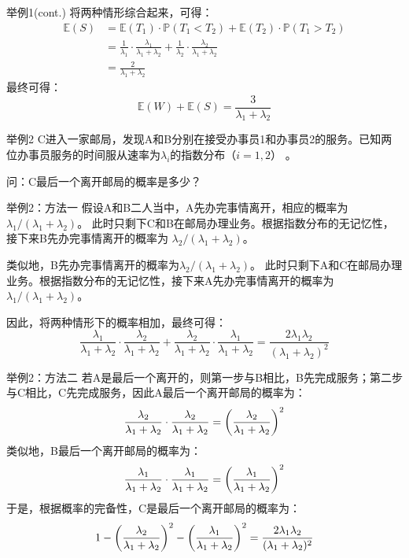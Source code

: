\documentclass[t]{beamer}
\renewcommand{\Pr}{\mathbb{P}}
\newcommand{\E}{\mathbb{E}}
\begin{document}
\begin{frame}{举例1(cont.)}
    将两种情形综合起来，可得：
\[\begin{split}
\E(S)&=\E(T_1)\cdot \Pr(T_1<T_2)+\E(T_2)\cdot \Pr(T_1>T_2)\\
&=\frac{1}{\lambda_1}\cdot \frac{\lambda_1}{\lambda_1+\lambda_2}+\frac{1}{\lambda_2}\cdot \frac{\lambda_2}{\lambda_1+\lambda_2}\\
&=\frac{2}{\lambda_1+\lambda_2}
\end{split}
\]
最终可得：
\[\E(W)+\E(S)=\frac{3}{\lambda_1+\lambda_2} \]
\end{frame}



\begin{frame}{举例2}
    C进入一家邮局，发现A和B分别在接受办事员1和办事员2的服务。已知两位办事员服务的时间服从速率为$\lambda_i$的指数分布（$i=1,2$）
	。
	
    问：C最后一个离开邮局的概率是多少？
    

\end{frame}


\begin{frame}{举例2：方法一}
    假设A和B二人当中，A先办完事情离开，相应的概率为${\lambda_1}/{(\lambda_1+\lambda_2)}$。
此时只剩下C和B在邮局办理业务。根据指数分布的无记忆性，接下来B先办完事情离开的概率为
${\lambda_2}/{(\lambda_1+\lambda_2)} $。

类似地，B先办完事情离开的概率为${\lambda_2}/{(\lambda_1+\lambda_2)}$。
此时只剩下A和C在邮局办理业务。根据指数分布的无记忆性，接下来A先办完事情离开的概率为${\lambda_1}/{(\lambda_1+\lambda_2)}$。

因此，将两种情形下的概率相加，最终可得：
\[\frac{\lambda_1}{\lambda_1+\lambda_2}\cdot \frac{\lambda_2}{\lambda_1+\lambda_2}+\frac{\lambda_2}{\lambda_1+\lambda_2}\cdot \frac{\lambda_1}{\lambda_1+\lambda_2}=\frac{2\lambda_1 \lambda_2}{(\lambda_1+\lambda_2)^2} \]
\end{frame}


\begin{frame}{举例2：方法二}
若A是最后一个离开的，则第一步与B相比，B先完成服务；第二步与C相比，C先完成服务，因此A最后一个离开邮局的概率为：
\[\frac{\lambda_2}{\lambda_1+\lambda_2}\cdot \frac{\lambda_2}{\lambda_1+\lambda_2}=\qty(\frac{\lambda_2}{\lambda_1+\lambda_2})^2 \]
类似地，B最后一个离开邮局的概率为：
\[\frac{\lambda_1}{\lambda_1+\lambda_2}\cdot \frac{\lambda_1}{\lambda_1+\lambda_2}=\qty(\frac{\lambda_1}{\lambda_1+\lambda_2})^2 \]
于是，根据概率的完备性，C是最后一个离开邮局的概率为：
\[1-\qty(\frac{\lambda_2}{\lambda_1+\lambda_2})^2-\qty(\frac{\lambda_1}{\lambda_1+\lambda_2})^2=\frac{2\lambda_1 \lambda_2}{(\lambda_1+\lambda_2)^2}\]
\end{frame}
\end{document}
